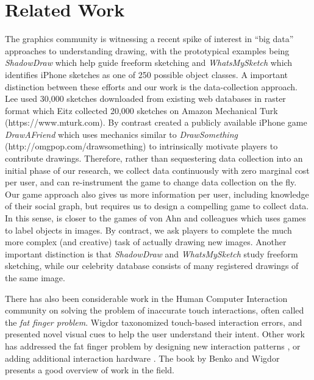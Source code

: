 \section{Related Work}

The graphics community is witnessing a recent spike of interest in
``big data'' approaches to understanding drawing, with the
prototypical examples being \emph{ShadowDraw} \cite{Lee:2011} which
help guide freeform sketching and \emph{WhatsMySketch}
\cite{Eitz:2012:HSO} which identifies iPhone sketches as one of 250
possible object classes. A important distinction between these
efforts and our work is the data-collection approach. Lee \etal used
30,000 sketches downloaded from existing web databases in raster
format which Eitz \etal collected 20,000 sketches on Amazon
Mechanical Turk (https://www.mturk.com). By contrast created a
publicly available iPhone game \emph{DrawAFriend} which uses
mechanics similar to \emph{DrawSomething}
(http://omgpop.com/drawsomething) to intrinsically motivate players
to contribute drawings. Therefore, rather than sequestering data
collection into an initial phase of our research, we collect data
continuously with zero marginal cost per user, and can re-instrument
the game to change data collection on the fly. Our game approach
also gives us more information per user, including knowledge of
their social graph, but requires us to design a compelling game to
collect data. In this sense, \daf is closer to the games of von Ahn
and colleagues  which
uses games to label objects in images. By contract, we ask players
to complete the much more complex (and creative) task of actually
drawing new images. Another important distinction is that \emph{ShadowDraw} and
\emph{WhatsMySketch} study freeform sketching, while our celebrity
database consists of many registered drawings of the same image.

There has also been considerable work in the Human Computer
Interaction community on solving the problem of inaccurate touch
interactions, often called the \emph{fat finger problem}. Wigdor
\etal {} taxonomized touch-based
interaction errors, and presented novel visual cues to help the user
understand their intent. Other work has addressed the fat finger
problem by designing new interaction patterns
\cite{Albinsson:2003:HPT,Benko:2006:PST,Forlines06hybridpointing,Vogel07shift:a},
or adding additional interaction hardware
\cite{Scott:2010:RTE,Wigdor:2006:UTI,Wigdor:2007:LTS}. The book by
Benko and Wigdor  presents a good
overview of work in the field.

